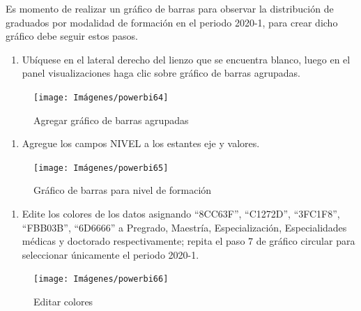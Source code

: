 \documentclass[
]{book}
\providecommand{\tightlist}{%
  \setlength{\itemsep}{0pt}\setlength{\parskip}{0pt}}
\begin{document}
Es momento de realizar un gráfico de barras para observar la distribución de graduados por modalidad de formación en el periodo 2020-1, para crear dicho gráfico debe seguir estos pasos.

\begin{enumerate}
\def\labelenumi{\arabic{enumi}.}
\tightlist
\item
  Ubíquese en el lateral derecho del lienzo que se encuentra blanco, luego en el panel visualizaciones haga clic sobre gráfico de barras agrupadas.
\end{enumerate}

\begin{figure}

{\centering \texttt{[image: Imágenes/powerbi64]} 

}

\caption{Agregar gráfico de barras agrupadas}\label{fig:paso1barras-fig}
\end{figure}

\begin{enumerate}
\def\labelenumi{\arabic{enumi}.}
\setcounter{enumi}{1}
\tightlist
\item
  Agregue los campos NIVEL a los estantes eje y valores.
\end{enumerate}

\begin{figure}

{\centering \texttt{[image: Imágenes/powerbi65]} 

}

\caption{Gráfico de barras para nivel de formación}\label{fig:paso2barras-fig}
\end{figure}

\begin{enumerate}
\def\labelenumi{\arabic{enumi}.}
\setcounter{enumi}{2}
\tightlist
\item
  Edite los colores de los datos asignando ``8CC63F'', ``C1272D'', ``3FC1F8'', ``FBB03B'', ``6D6666'' a Pregrado, Maestría, Especialización, Especialidades médicas y doctorado respectivamente; repita el paso 7 de gráfico circular para seleccionar únicamente el periodo 2020-1.
\end{enumerate}

\begin{figure}

{\centering \texttt{[image: Imágenes/powerbi66]} 

}

\caption{Editar colores}\label{fig:paso3barras-fig}
\end{figure}
\end{document}
